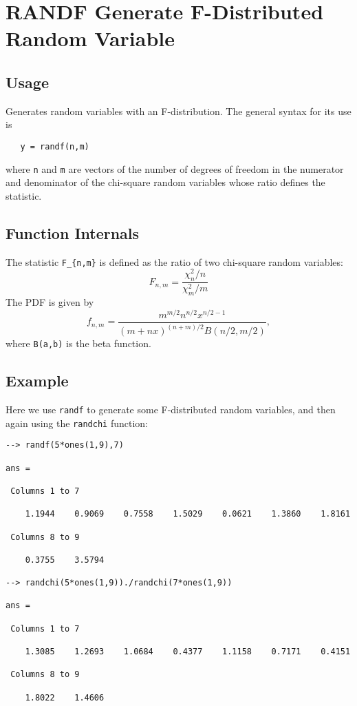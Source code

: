 \section{RANDF Generate F-Distributed Random Variable}

\subsection{Usage}

Generates random variables with an F-distribution.  The general
syntax for its use is
\begin{verbatim}
   y = randf(n,m)
\end{verbatim}
where \verb|n| and \verb|m| are vectors of the number of degrees of freedom
in the numerator and denominator of the chi-square random variables
whose ratio defines the statistic.
\subsection{Function Internals}

The statistic \verb|F_{n,m}| is defined as the ratio of two chi-square
random variables:
\[
  F_{n,m} = \frac{\chi_n^2/n}{\chi_m^2/m}
\]
The PDF is given by
\[
  f_{n,m} = \frac{m^{m/2}n^{n/2}x^{n/2-1}}{(m+nx)^{(n+m)/2}B(n/2,m/2)},
\]
where \verb|B(a,b)| is the beta function.
\subsection{Example}

Here we use \verb|randf| to generate some F-distributed random variables,
and then again using the \verb|randchi| function:
\begin{verbatim}
--> randf(5*ones(1,9),7)

ans = 

 Columns 1 to 7

    1.1944    0.9069    0.7558    1.5029    0.0621    1.3860    1.8161 

 Columns 8 to 9

    0.3755    3.5794 

--> randchi(5*ones(1,9))./randchi(7*ones(1,9))

ans = 

 Columns 1 to 7

    1.3085    1.2693    1.0684    0.4377    1.1158    0.7171    0.4151 

 Columns 8 to 9

    1.8022    1.4606 
\end{verbatim}
